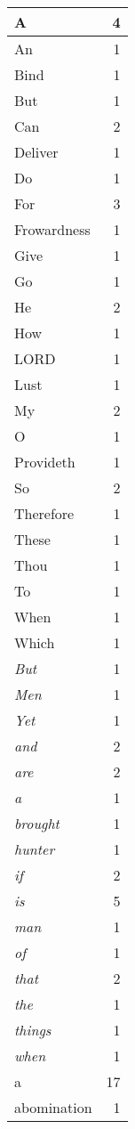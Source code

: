 \begin{center}
\begin{longtable}{l|r}
A & 4\\ \hline 
An & 1\\ \hline 
Bind & 1\\ \hline 
But & 1\\ \hline 
Can & 2\\ \hline 
Deliver & 1\\ \hline 
Do & 1\\ \hline 
For & 3\\ \hline 
Frowardness & 1\\ \hline 
Give & 1\\ \hline 
Go & 1\\ \hline 
He & 2\\ \hline 
How & 1\\ \hline 
LORD & 1\\ \hline 
Lust & 1\\ \hline 
My & 2\\ \hline 
O & 1\\ \hline 
Provideth & 1\\ \hline 
So & 2\\ \hline 
Therefore & 1\\ \hline 
These & 1\\ \hline 
Thou & 1\\ \hline 
To & 1\\ \hline 
When & 1\\ \hline 
Which & 1\\ \hline 
\emph{But} & 1\\ \hline 
\emph{Men} & 1\\ \hline 
\emph{Yet} & 1\\ \hline 
\emph{and} & 2\\ \hline 
\emph{are} & 2\\ \hline 
\emph{a} & 1\\ \hline 
\emph{brought} & 1\\ \hline 
\emph{hunter} & 1\\ \hline 
\emph{if} & 2\\ \hline 
\emph{is} & 5\\ \hline 
\emph{man} & 1\\ \hline 
\emph{of} & 1\\ \hline 
\emph{that} & 2\\ \hline 
\emph{the} & 1\\ \hline 
\emph{things} & 1\\ \hline 
\emph{when} & 1\\ \hline 
a & 17\\ \hline 
abomination & 1\\ \hline 

\end{longtable}
\end{center}
